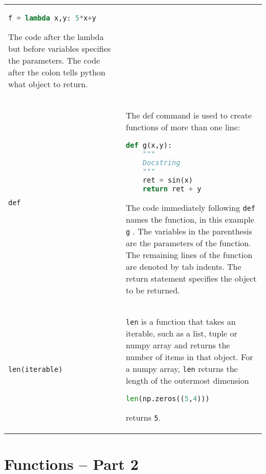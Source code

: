 \begin{tabular}[]{@{}ll@{}}
\begin{minipage}[t]{0.77\columnwidth}
\begin{lstlisting}[language=Python]
f = lambda x,y: 5*x+y
\end{lstlisting}

The code after the lambda but before variables specifies the parameters.
The code after the colon tells python what object to return.
\end{minipage}\tabularnewline
\begin{minipage}[t]{0.17\columnwidth}\raggedright
\lstinline!def!
\end{minipage} & \begin{minipage}[t]{0.77\columnwidth}\raggedright
The def command is used to create functions of more than one line:

\begin{lstlisting}[language=Python]
def g(x,y):
    """
    Docstring
    """
    ret = sin(x)
    return ret + y
\end{lstlisting}

The code immediately following \lstinline!def! names the function, in
this example \lstinline!g! . The variables in the parenthesis are the
parameters of the function. The remaining lines of the function are
denoted by tab indents. The return statement specifies the object to be
returned.
\end{minipage}\tabularnewline
\begin{minipage}[t]{0.17\columnwidth}\raggedright
\lstinline!len(iterable)!
\end{minipage} & \begin{minipage}[t]{0.77\columnwidth}\raggedright
\lstinline!len! is a function that takes an iterable, such as a list,
tuple or numpy array and returns the number of items in that object. For
a numpy array, \lstinline!len! returns the length of the outermost
dimension

\begin{lstlisting}[language=Python]
len(np.zeros((5,4)))
\end{lstlisting}

returns \lstinline!5!.


\end{minipage}\tabularnewline
\bottomrule
\end{tabular}

\section{Functions -- Part 2}\label{functions_pt2}


